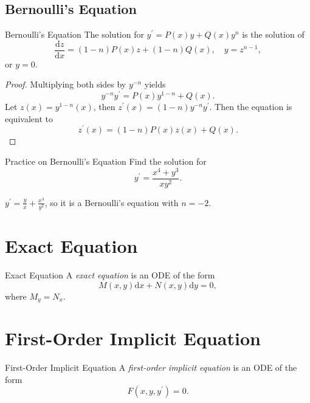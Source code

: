 \subsection{Bernoulli's Equation}

\begin{proposition}{Bernoulli's Equation}{}
  The solution for $y^{\prime} = P(x) y + Q(x) y^n$ is the solution of
  \begin{equation}
    \frac{\mathrm{d} z}{\mathrm{d} x} = (1-n)P(x)z + (1-n)Q(x), \quad y = z^{n-1},
  \end{equation}
  or $y = 0$.
\end{proposition}

\begin{proof}
  Multiplying both sides by $y^{-n}$ yields
  \begin{equation}
    y^{-n}y^{\prime} = P(x)y^{1-n} + Q(x).
  \end{equation}
  Let $z(x) = y^{1-n}(x)$, then $z^{\prime}(x) = (1-n)y^{-n}y^{\prime}$. Then the equation is equivalent to
  \begin{equation}
    z^{\prime}(x) = (1-n)P(x)z(x) + Q(x).
  \end{equation}
\end{proof}

\begin{example}{Practice on Bernoulli's Equation}{}
  Find the solution for
  \begin{equation}
    y^{\prime} = \frac{x^4 + y^3}{xy^2}.
  \end{equation}
\end{example}

\begin{solution}
  $y^{\prime} = \frac{y}{x} + \frac{x^3}{y^2}$, so it is a Bernoulli's equation with $n = -2$.
\end{solution}

\section{Exact Equation}

\begin{definition}{Exact Equation}{}
  A \emph{exact equation} is an ODE of the form
  \begin{equation}
    M(x,y)\mathrm{d} x + N(x,y)\mathrm{d} y = 0,
  \end{equation}
  where $M_y = N_x$.
\end{definition}

\section{First-Order Implicit Equation}

\begin{definition}{First-Order Implicit Equation}{}
  A \emph{first-order implicit equation} is an ODE of the form
  \begin{equation}
    F(x, y, y^{\prime}) = 0.
  \end{equation}
\end{definition}






